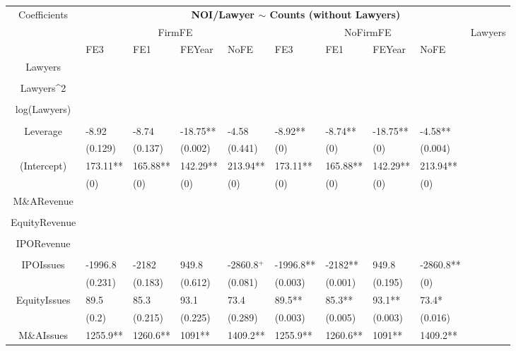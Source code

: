 \documentclass{article}
\begin{document}
\begin{table}[H]
\centering
\begin{tabular}{|clllllllll|}
\hline
\multirow{3}{*}{Coefficients} & \multicolumn{9}{c|}{\textbf{NOI/Lawyer $\sim$ Counts (without Lawyers)}} \\
\cline{2-10}
& \multicolumn{4}{c}{FirmFE} & \multicolumn{4}{c}{NoFirmFE} & \multirow{2}{*}{Lawyers} \\
\cline{2-9}
& FE3 & FE1 & FEYear & NoFE & FE3 & FE1 & FEYear & NoFE &  \\
\hline
 
Lawyers &  &  &  &  &  &  &  &  & \\ 
   &  &  &  &  &  &  &  &  & \\ 
  Lawyers^2 &  &  &  &  &  &  &  &  & \\ 
   &  &  &  &  &  &  &  &  & \\ 
  log(Lawyers) &  &  &  &  &  &  &  &  & \\ 
   &  &  &  &  &  &  &  &  & \\ 
  Leverage & -8.92 & -8.74 & -18.75** & -4.58 & -8.92** & -8.74** & -18.75** & -4.58** & \\ 
   & (0.129) & (0.137) & (0.002) & (0.441) & (0) & (0) & (0) & (0.004) & \\ 
  (Intercept) & 173.11** & 165.88** & 142.29** & 213.94** & 173.11** & 165.88** & 142.29** & 213.94** & \\ 
   & (0) & (0) & (0) & (0) & (0) & (0) & (0) & (0) & \\ 
  M\&ARevenue &  &  &  &  &  &  &  &  & \\ 
   &  &  &  &  &  &  &  &  & \\ 
  EquityRevenue &  &  &  &  &  &  &  &  & \\ 
   &  &  &  &  &  &  &  &  & \\ 
  IPORevenue &  &  &  &  &  &  &  &  & \\ 
   &  &  &  &  &  &  &  &  & \\ 
  IPOIssues & -1996.8 & -2182 & 949.8 & -2860.8$^{+}$ & -1996.8** & -2182** & 949.8 & -2860.8** & \\ 
   & (0.231) & (0.183) & (0.612) & (0.081) & (0.003) & (0.001) & (0.195) & (0) & \\ 
  EquityIssues & 89.5 & 85.3 & 93.1 & 73.4 & 89.5** & 85.3** & 93.1** & 73.4* & \\ 
   & (0.2) & (0.215) & (0.225) & (0.289) & (0.003) & (0.005) & (0.003) & (0.016) & \\ 
  M\&AIssues & 1255.9** & 1260.6** & 1091** & 1409.2** & 1255.9** & 1260.6** & 1091** & 1409.2** & \\ 

\end{tabular}
\end{table}
\end{document}
